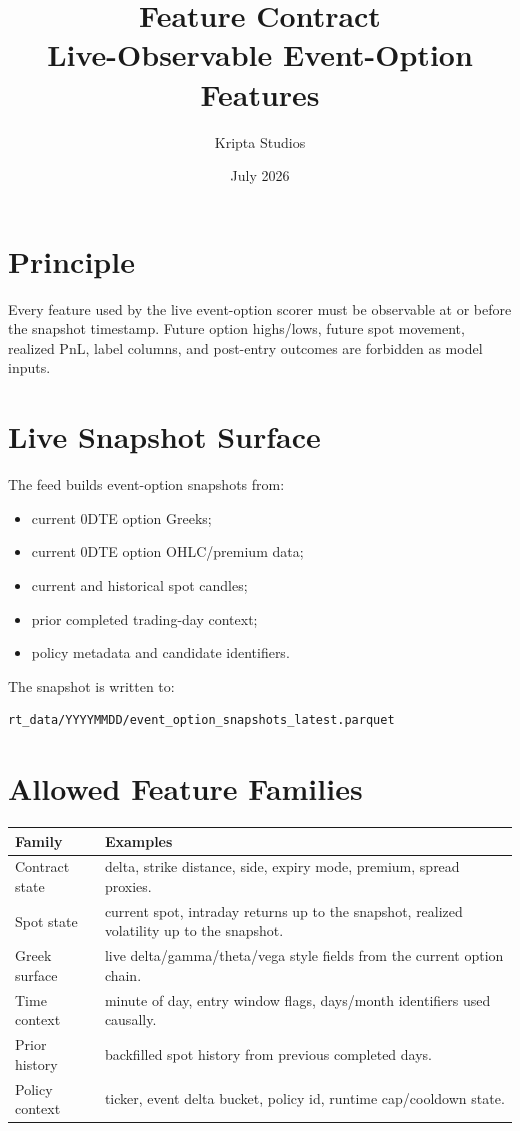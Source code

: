 \documentclass[11pt,a4paper]{article}
\title{\textbf{Feature Contract}\\Live-Observable Event-Option Features}
\author{Kripta Studios}
\date{July 2026}
\begin{document}
\maketitle
\tableofcontents
\newpage

\section{Principle}

Every feature used by the live event-option scorer must be observable at or before the snapshot timestamp. Future option highs/lows, future spot movement, realized PnL, label columns, and post-entry outcomes are forbidden as model inputs.

\section{Live Snapshot Surface}

The feed builds event-option snapshots from:

\begin{itemize}
  \item current 0DTE option Greeks;
  \item current 0DTE option OHLC/premium data;
  \item current and historical spot candles;
  \item prior completed trading-day context;
  \item policy metadata and candidate identifiers.
\end{itemize}

The snapshot is written to:

\begin{lstlisting}
rt_data/YYYYMMDD/event_option_snapshots_latest.parquet
\end{lstlisting}

\section{Allowed Feature Families}

\begin{center}
\begin{tabularx}{\textwidth}{lX}
\toprule
Family & Examples \\
\midrule
Contract state & delta, strike distance, side, expiry mode, premium, spread proxies. \\
Spot state & current spot, intraday returns up to the snapshot, realized volatility up to the snapshot. \\
Greek surface & live delta/gamma/theta/vega style fields from the current option chain. \\
Time context & minute of day, entry window flags, days/month identifiers used causally. \\
Prior history & backfilled spot history from previous completed days. \\
Policy context & ticker, event delta bucket, policy id, runtime cap/cooldown state. \\
\bottomrule
\end{tabularx}
\end{center}
\end{document}
